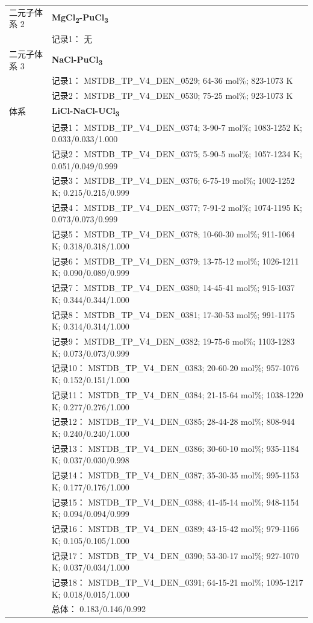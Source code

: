 \documentclass[12pt]{article}
\begin{document}
{\begin{longtable}[]{@{}
  >{\raggedright\arraybackslash}p{}
  >{\raggedright\arraybackslash}p{}@{}}
二元子体系 2 & \textbf{MgCl\textsubscript{2}-PuCl\textsubscript{3}} \\
 & 记录1： 无 \\
二元子体系 3  & \textbf{NaCl-PuCl\textsubscript{3}} \\
 & 记录1： MSTDB\_TP\_V4\_DEN\_0529; 64-36 mol\%; 823-1073 K \\
 & 记录2： MSTDB\_TP\_V4\_DEN\_0530; 75-25 mol\%; 923-1073 K  \\

\midrule
体系 & \textbf{LiCl-NaCl-UCl\textsubscript{3}} \\
 & 记录1： MSTDB\_TP\_V4\_DEN\_0374; 3-90-7 mol\%; 1083-1252 K; 0.033/0.033/1.000 \\
 & 记录2： MSTDB\_TP\_V4\_DEN\_0375; 5-90-5 mol\%; 1057-1234 K; 0.051/0.049/0.999 \\
 & 记录3： MSTDB\_TP\_V4\_DEN\_0376; 6-75-19 mol\%; 1002-1252 K; 0.215/0.215/0.999 \\
 & 记录4： MSTDB\_TP\_V4\_DEN\_0377; 7-91-2 mol\%; 1074-1195 K; 0.073/0.073/0.999 \\
 & 记录5： MSTDB\_TP\_V4\_DEN\_0378; 10-60-30 mol\%; 911-1064 K; 0.318/0.318/1.000 \\
 & 记录6： MSTDB\_TP\_V4\_DEN\_0379; 13-75-12 mol\%; 1026-1211 K; 0.090/0.089/0.999 \\
 & 记录7： MSTDB\_TP\_V4\_DEN\_0380; 14-45-41 mol\%; 915-1037 K; 0.344/0.344/1.000 \\
 & 记录8： MSTDB\_TP\_V4\_DEN\_0381; 17-30-53 mol\%; 991-1175 K; 0.314/0.314/1.000 \\
 & 记录9： MSTDB\_TP\_V4\_DEN\_0382; 19-75-6 mol\%; 1103-1283 K; 0.073/0.073/0.999 \\
 & 记录10： MSTDB\_TP\_V4\_DEN\_0383; 20-60-20 mol\%; 957-1076 K; 0.152/0.151/1.000 \\
 & 记录11： MSTDB\_TP\_V4\_DEN\_0384; 21-15-64 mol\%; 1038-1220 K; 0.277/0.276/1.000 \\
 & 记录12： MSTDB\_TP\_V4\_DEN\_0385; 28-44-28 mol\%; 808-944 K; 0.240/0.240/1.000 \\
 & 记录13： MSTDB\_TP\_V4\_DEN\_0386; 30-60-10 mol\%; 935-1184 K; 0.037/0.030/0.998 \\
 & 记录14： MSTDB\_TP\_V4\_DEN\_0387; 35-30-35 mol\%; 995-1153 K; 0.177/0.176/1.000 \\
 & 记录15： MSTDB\_TP\_V4\_DEN\_0388; 41-45-14 mol\%; 948-1154 K; 0.094/0.094/0.999 \\
 & 记录16： MSTDB\_TP\_V4\_DEN\_0389; 43-15-42 mol\%; 979-1166 K; 0.105/0.105/1.000 \\
 & 记录17： MSTDB\_TP\_V4\_DEN\_0390; 53-30-17 mol\%; 927-1070 K; 0.037/0.034/1.000 \\
 & 记录18： MSTDB\_TP\_V4\_DEN\_0391; 64-15-21 mol\%; 1095-1217 K; 0.018/0.015/1.000 \\
 & 总体： 0.183/0.146/0.992  \\


\end{longtable}}
\end{document}
